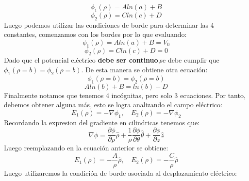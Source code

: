 \documentclass[
  11pt,
  letterpaper,
   addpoints,
   answers
  ]{exam}
\begin{document}
\begin{questions}
\begin{solution}
\begin{enumerate}
            \begin{equation}
                \phi_{1}(\rho) = Aln(a) + B 
            \end{equation}
            \begin{equation}
                \phi_{2}(\rho) = Cln(c) + D 
            \end{equation}
            Luego podemos utilizar las condiciones de borde para determinar las 4 constantes, comenzamos con los bordes por lo que evaluando:
            \begin{equation}
                \phi_{1}(\rho) = Aln(a) + B = V_{0}
            \end{equation}
            \begin{equation}
                \phi_{2}(\rho) = Cln(c) + D = 0
            \end{equation}
            Dado que el potencial eléctrico \textbf{debe ser continuo},se debe cumplir que $\phi_{1}(\rho=b) =\phi_{2}(\rho=b) $. De esta manera se obtiene otra ecuación:
            \begin{equation}
                \phi_{1}(\rho=b) = \phi_{2}(\rho=b)
            \end{equation}
            \begin{equation}
                Aln(b) + B = ln(b) + D 
            \end{equation}
            Finalmente notamos que tenemos 4 incógnitas, pero solo 3 ecuaciones. Por tanto, debemos obtener alguna más, esto se logra analizando el campo eléctrico:
            \begin{equation}
                E_{1}(\rho) = -\nabla\phi_{1}, \quad E_{2}(\rho) = -\nabla\phi_{2}
            \end{equation}
            Recordando la expresion del gradiente en cilindricas tenemos que:
            \begin{equation}
                \nabla\phi = \frac{\partial \phi}{\partial \rho} \hat{\rho} + \frac{1}{\rho}\frac{\partial \phi}{\partial \theta} \hat{\theta} + \frac{\partial \phi}{\partial z} \hat{z}
            \end{equation}
            Luego reemplazando en la ecuación anterior se obtiene:
            \begin{equation}
                E_{1}(\rho) =-\frac{A}{\rho} \hat{\rho}, \quad E_{2}(\rho) = -\frac{C}{\rho} \hat{\rho}
            \end{equation}
            Luego utilizaremos la condición de borde asociada al desplazamiento eléctrico:
            \begin{equation}

\end{equation}
\end{enumerate}
\end{solution}
\end{questions}
\end{document}
